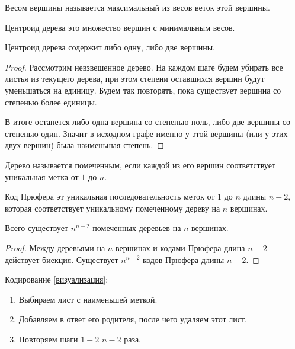 \begin{definition}
  Весом вершины называется максимальный из весов веток этой вершины.
\end{definition}

\begin{definition}
  Центроид дерева это множество вершин с минимальным весов.
\end{definition}

\begin{lemma}
  Центроид дерева содержит либо одну, либо две вершины.
\end{lemma}
\begin{proof}
  Рассмотрим невзвешенное дерево. На каждом шаге будем убирать все листья из
  текущего дерева, при этом степени оставшихся вершин будут уменьшаться на
  единицу. Будем так повторять, пока существует вершина со степенью более
  единицы.
  
  В итоге останется либо одна вершина со степенью ноль, либо две вершины со
  степенью один. Значит в исходном графе именно у этой вершины (или у этих двух
  вершин) была наименьшая степень.
\end{proof}

\begin{definition}
  Дерево называется помеченным, если каждой из его вершин соответствует
  уникальная метка от \(1\) до \(n\).
\end{definition}

\begin{definition}
  Код Прюфера эт уникальная последовательность меток от \(1\) до \(n\) длины
  \(n - 2\), которая соответствует уникальному помеченному дереву на \(n\)
  вершинах.
\end{definition}

\begin{lemma}
  Всего существует \(n^{n - 2}\) помеченных деревьев на \(n\) вершинах.
\end{lemma}
\begin{proof}
  Между деревьями на \(n\) вершинах и кодами Прюфера длина \(n -2\) действует
  биекция. Существует \(n^{n - 2}\) кодов Прюфера длины \(n - 2\).
\end{proof}

Кодирование
[\href{https://www.youtube.com/watch?v=Caqn-Vx4PoY}{визуализация}]:
\begin{enumerate}
  \item Выбираем лист с наименьшей меткой.
  \item Добавляем в ответ его родителя, после чего удаляем этот лист.
  \item Повторяем шаги \(1-2\) \(n - 2\) раза.
\end{enumerate}

